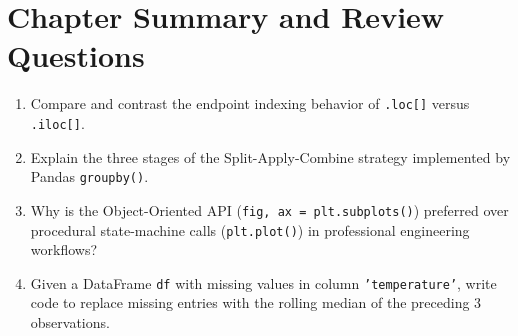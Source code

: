 \section{Chapter Summary and Review Questions}
\begin{enumerate}[leftmargin=1.8em, itemsep=4pt]
    \item Compare and contrast the endpoint indexing behavior of \texttt{.loc[]} versus \texttt{.iloc[]}.
    \item Explain the three stages of the Split-Apply-Combine strategy implemented by Pandas \texttt{groupby()}.
    \item Why is the Object-Oriented API (\texttt{fig, ax = plt.subplots()}) preferred over procedural state-machine calls (\texttt{plt.plot()}) in professional engineering workflows?
    \item Given a DataFrame \texttt{df} with missing values in column \texttt{'temperature'}, write code to replace missing entries with the rolling median of the preceding 3 observations.
\end{enumerate}
